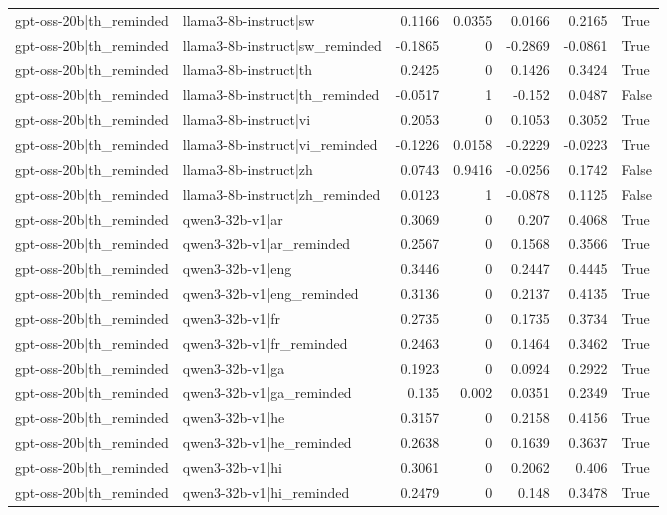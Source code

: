 \begin{table}
\begin{tabular}{l l r r r r l}
gpt-oss-20b|th_reminded & llama3-8b-instruct|sw & 0.1166 & 0.0355 & 0.0166 & 0.2165 & True \\
gpt-oss-20b|th_reminded & llama3-8b-instruct|sw_reminded & -0.1865 & 0 & -0.2869 & -0.0861 & True \\
gpt-oss-20b|th_reminded & llama3-8b-instruct|th & 0.2425 & 0 & 0.1426 & 0.3424 & True \\
gpt-oss-20b|th_reminded & llama3-8b-instruct|th_reminded & -0.0517 & 1 & -0.152 & 0.0487 & False \\
gpt-oss-20b|th_reminded & llama3-8b-instruct|vi & 0.2053 & 0 & 0.1053 & 0.3052 & True \\
gpt-oss-20b|th_reminded & llama3-8b-instruct|vi_reminded & -0.1226 & 0.0158 & -0.2229 & -0.0223 & True \\
gpt-oss-20b|th_reminded & llama3-8b-instruct|zh & 0.0743 & 0.9416 & -0.0256 & 0.1742 & False \\
gpt-oss-20b|th_reminded & llama3-8b-instruct|zh_reminded & 0.0123 & 1 & -0.0878 & 0.1125 & False \\
gpt-oss-20b|th_reminded & qwen3-32b-v1|ar & 0.3069 & 0 & 0.207 & 0.4068 & True \\
gpt-oss-20b|th_reminded & qwen3-32b-v1|ar_reminded & 0.2567 & 0 & 0.1568 & 0.3566 & True \\
gpt-oss-20b|th_reminded & qwen3-32b-v1|eng & 0.3446 & 0 & 0.2447 & 0.4445 & True \\
gpt-oss-20b|th_reminded & qwen3-32b-v1|eng_reminded & 0.3136 & 0 & 0.2137 & 0.4135 & True \\
gpt-oss-20b|th_reminded & qwen3-32b-v1|fr & 0.2735 & 0 & 0.1735 & 0.3734 & True \\
gpt-oss-20b|th_reminded & qwen3-32b-v1|fr_reminded & 0.2463 & 0 & 0.1464 & 0.3462 & True \\
gpt-oss-20b|th_reminded & qwen3-32b-v1|ga & 0.1923 & 0 & 0.0924 & 0.2922 & True \\
gpt-oss-20b|th_reminded & qwen3-32b-v1|ga_reminded & 0.135 & 0.002 & 0.0351 & 0.2349 & True \\
gpt-oss-20b|th_reminded & qwen3-32b-v1|he & 0.3157 & 0 & 0.2158 & 0.4156 & True \\
gpt-oss-20b|th_reminded & qwen3-32b-v1|he_reminded & 0.2638 & 0 & 0.1639 & 0.3637 & True \\
gpt-oss-20b|th_reminded & qwen3-32b-v1|hi & 0.3061 & 0 & 0.2062 & 0.406 & True \\
gpt-oss-20b|th_reminded & qwen3-32b-v1|hi_reminded & 0.2479 & 0 & 0.148 & 0.3478 & True \\

\end{tabular}
\end{table}
